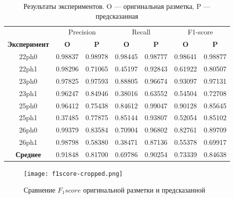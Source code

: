 \begin{table}[ht]
\centering
\caption{\centering Результаты экспериментов. O --- оригинальная разметка, P --- предсказанная}
\label{tab:results}
	\begin{tabular}{ccccccc} \toprule
		& \multicolumn{2}{c}{Precision} & \multicolumn{2}{c}{Recall} & \multicolumn{2}{c}{F1-score} \\
		\textbf{Эксперимент}& \textbf{O} & \textbf{P}& \textbf{O} & \textbf{P}& \textbf{O} & \textbf{P} \\ \midrule
		22ph0               & 0.98837                & 0.98978               & 0.98445             & 0.98777            & 0.98641                  & 0.98877                  \\
		22ph1               & 0.98296                & 0.71065               & 0.45197             & 0.92843            & 0.61922                  & 0.80507                  \\
		23ph0               & 0.97825                & 0.97593               & 0.88805             & 0.96674            & 0.93097                  & 0.97131                  \\
		23ph1               & 0.96247                & 0.84946               & 0.38016             & 0.63552            & 0.54504                  & 0.72708                  \\
		25ph0               & 0.96412                & 0.75438               & 0.84612             & 0.99047            & 0.90128                  & 0.85645                  \\
		25ph1               & 0.37485                & 0.77875               & 0.85144             & 0.93807            & 0.52054                  & 0.85102                  \\
		26ph0               & 0.99379                & 0.83584               & 0.70904             & 0.96802            & 0.82761                  & 0.89709                  \\
		26ph1               & 0.98798                & 0.58380               & 0.38471             & 0.87136            & 0.55378                  & 0.69917                  \\ \midrule
		\textbf{Среднее}    & 0.91848                & 0.81700               & 0.69786             & 0.90254            & 0.73339                  & 0.84638                  \\ \bottomrule
	\end{tabular}
\end{table}

\begin{figure}[!htb]
	\centering
	\caption{Сравнение $F_1score$ оригинальной разметки и предсказанной}
	\texttt{[image: f1score-cropped.png]}
	\label{fig:f1score-vs}
\end{figure}
